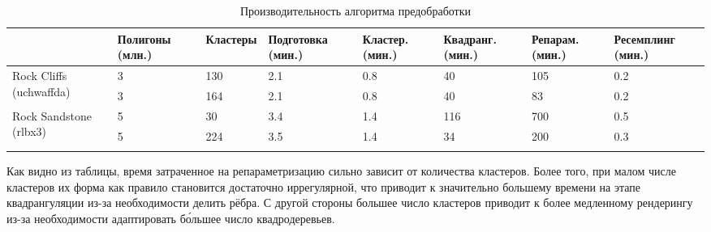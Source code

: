 \documentclass[12pt]{extarticle}
\begin{document}
\begin{table}[ht]
\small
\centering
\begin{tabular}{ l | p{16mm} | p{15mm} | p{17mm} | p{12mm} | p{14mm} | p{13mm} | p{17mm} }
                        & Полигоны (млн.) & Кластеры & Подготовка (мин.) & Кластер. (мин.) & Квадранг. (мин.) & Репарам. (мин.) & Ресемплинг (мин.) \\
\hline
\multirow{2}{18mm}{Rock Cliffs (uchwaffda)}
& 3    & 130 & 2.1   & 0.8  & 40   & 105    & 0.2   \\
& 3    & 164 & 2.1   & 0.8  & 40   & 83     & 0.2   \\
\hline
\multirow{3}{16mm}{Rock Sandstone (rlbx3)}
& 5    & 30  & 3.4   & 1.4  & 116  & 700    & 0.5   \\
& 5    & 224 & 3.5   & 1.4  & 34   & 200    & 0.3   \\
&&&&&&&\\
\end{tabular}
\caption{Производительность алгоритма предобработки}
\end{table}

Как видно из таблицы, время затраченное на репараметризацию сильно зависит от количества кластеров. Более того, при малом числе кластеров их форма как правило становится достаточно иррегулярной, что приводит к значительно большему времени на этапе квадрангуляции из-за необходимости делить рёбра. С другой стороны большее число кластеров приводит к более медленному рендерингу из-за необходимости адаптировать б\'ольшее число квадродеревьев.
\end{document}
